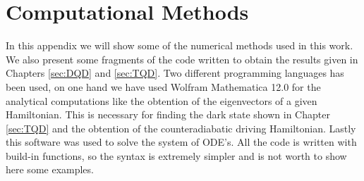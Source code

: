 
\chapter{Computational Methods} %

\label{app:Numerical_methods} %

In this appendix we will show some of the numerical methods used in this work. We also present some fragments of the code written to obtain the results given in Chapters \ref{sec:DQD} and \ref{sec:TQD}. Two different programming languages has been used, on one hand we have used Wolfram Mathematica 12.0 for the analytical computations like the obtention of the eigenvectors of a given Hamiltonian. This is necessary for finding the dark state shown in Chapter \ref{sec:TQD} and the obtention of the counteradiabatic driving Hamiltonian. Lastly this software was used to solve the system of ODE's. All the code is written with build-in functions, so the syntax is extremely simpler and is not worth to show here some examples.

